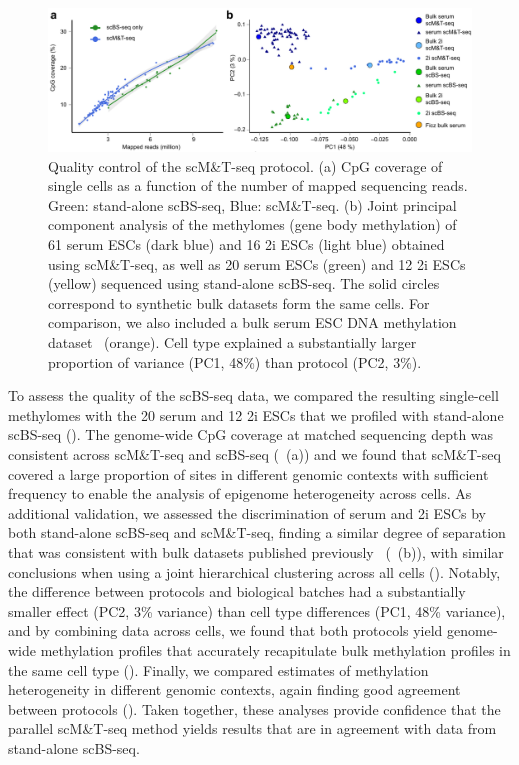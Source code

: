 \begin{figure}[htbp!]
\centering
\includegraphics[width=1.0\textwidth]{qc}
\caption[Quality control of the scM\&T-seq protocol.]{Quality control of the scM\&T-seq protocol. (a) CpG coverage of single cells as a function of the number of mapped sequencing reads. Green: stand-alone scBS-seq, Blue: scM\&T-seq. (b) Joint principal component analysis of the methylomes (gene body methylation) of 61 serum ESCs (dark blue) and 16 2i ESCs (light blue) obtained using scM\&T-seq, as well as 20 serum ESCs (green) and 12 2i ESCs (yellow) sequenced using stand-alone scBS-seq. The solid circles correspond to synthetic bulk datasets form the same cells. For comparison, we also included a bulk serum ESC DNA methylation dataset~\citep{ficz_fgf_2013} (orange). Cell type explained a substantially larger proportion of variance (PC1, 48\%) than protocol (PC2, 3\%).}
\label{fig:mt_qc}
\end{figure}

To assess the quality of the scBS-seq data, we compared the resulting single-cell methylomes with the 20 serum and 12 2i ESCs that we profiled with stand-alone scBS-seq (). The genome-wide CpG coverage at matched sequencing depth was consistent across scM\&T-seq and scBS-seq (~(a)) and we found that scM\&T-seq covered a large proportion of sites in different genomic contexts with sufficient frequency to enable the analysis of epigenome heterogeneity across cells. As additional validation, we assessed the discrimination of serum and 2i ESCs by both stand-alone scBS-seq and scM\&T-seq, finding a similar degree of separation that was consistent with bulk datasets published previously~\citep{ficz_fgf_2013} (~(b)), with similar conclusions when using a joint hierarchical clustering across all cells (). Notably, the difference between protocols and biological batches had a substantially smaller effect (PC2, 3\% variance) than cell type differences (PC1, 48\% variance), and by combining data across cells, we found that both protocols yield genome-wide methylation profiles that accurately recapitulate bulk methylation profiles in the same cell type (). Finally, we compared estimates of methylation heterogeneity in different genomic contexts, again finding good agreement between protocols (). Taken together, these analyses provide confidence that the parallel scM\&T-seq method yields results that are in agreement with data from stand-alone scBS-seq.

